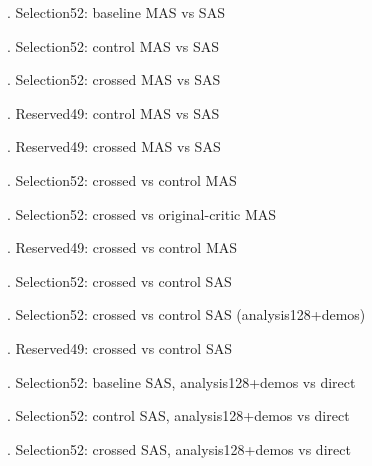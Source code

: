 . Selection52: baseline MAS vs SAS\par
{}. Selection52: control MAS vs SAS\par
{}. Selection52: crossed MAS vs SAS\par
{}. Reserved49: control MAS vs SAS\par
{}. Reserved49: crossed MAS vs SAS\par
{}. Selection52: crossed vs control MAS\par
{}. Selection52: crossed vs original-critic MAS\par
{}. Reserved49: crossed vs control MAS\par
{}. Selection52: crossed vs control SAS\par
{}. Selection52: crossed vs control SAS (analysis128+demos)\par
{}. Reserved49: crossed vs control SAS\par
{}. Selection52: baseline SAS, analysis128+demos vs direct\par
{}. Selection52: control SAS, analysis128+demos vs direct\par
{}. Selection52: crossed SAS, analysis128+demos vs direct\par